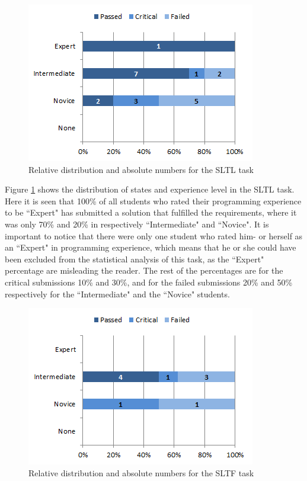 \documentclass{sig-alternate-05-2015}
\begin{document}
\begin{figure}[!ht]
	\centering
	\includegraphics[width=1\linewidth]{img06}
	\caption{Relative distribution and absolute numbers for the SLTL task}
	\label{fig:SLTL percentage distributions with relative task numbers}
\end{figure}

Figure \ref{fig:SLTL percentage distributions with relative task numbers} shows the distribution of states and experience level in the SLTL task.
Here it is seen that 100\% of all students who rated their programming experience to be ``Expert" has submitted a solution that fulfilled the requirements, where it was only 70\% and 20\% in respectively ``Intermediate" and ``Novice".
It is important to notice that there were only one student who rated him- or herself as an ``Expert" in programming experience, which means that he or she could have been excluded from the statistical analysis of this task, as the ``Expert" percentage are misleading the reader. The rest of the percentages are for the critical submissions 10\% and 30\%, and for the failed submissions 20\% and 50\% respectively for the ``Intermediate" and the ``Novice" students.

\begin{figure}[!ht]
	\centering
	\includegraphics[width=1\linewidth]{img07}
	\caption{Relative distribution and absolute numbers for the SLTF task}
	\label{fig:SLTF percentage distributions with relative task numbers}
\end{figure}
\end{document}
